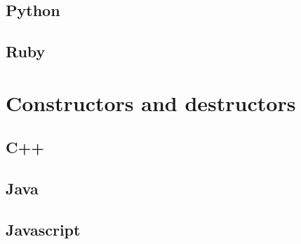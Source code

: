 \documentclass{KodeBook}
\begin{document}
\subsection{Python}



\subsection{Ruby}




\section{Constructors and destructors}

\subsection{C++}







\subsection{Java}







\subsection{Javascript}




\end{document}
